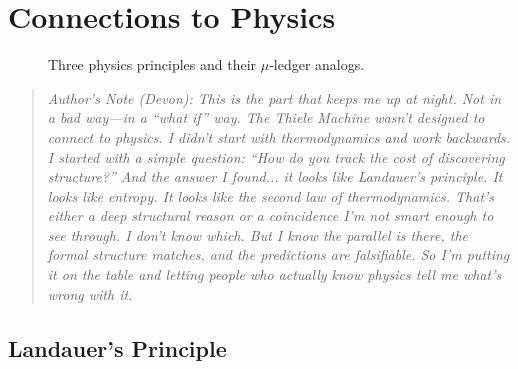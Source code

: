 \section{Connections to Physics}

\begin{figure}[h]
\centering
{}
\caption{Three physics principles and their $\mu$-ledger analogs.}
\label{fig:physics-connections}
\end{figure}

\begin{quote}
\textit{Author's Note (Devon): This is the part that keeps me up at night. Not in a bad way---in a ``what if'' way. The Thiele Machine wasn't designed to connect to physics. I didn't start with thermodynamics and work backwards. I started with a simple question: ``How do you track the cost of discovering structure?'' And the answer I found... it looks like Landauer's principle. It looks like entropy. It looks like the second law of thermodynamics. That's either a deep structural reason or a coincidence I'm not smart enough to see through. I don't know which. But I know the parallel is there, the formal structure matches, and the predictions are falsifiable. So I'm putting it on the table and letting people who actually know physics tell me what's wrong with it.}
\end{quote}

\subsection{Landauer's Principle}

